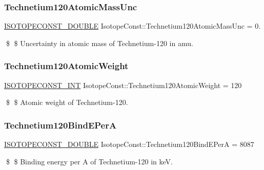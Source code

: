 \subsubsection{\texorpdfstring{Technetium120\+Atomic\+Mass\+Unc}{Technetium120AtomicMassUnc}}
{\footnotesize\ttfamily \mbox{\hyperlink{group___isotope_const-_macros_ga8f45a7272ce02c0b4c65c44636ed719a}{I\+S\+O\+T\+O\+P\+E\+C\+O\+N\+S\+T\+\_\+\+D\+O\+U\+B\+LE}} Isotope\+Const\+::\+Technetium120\+Atomic\+Mass\+Unc = 0.}

\$ \$ Uncertainty in atomic mass of Technetium-\/120 in amu. \mbox{\label{group___isotope_const-_technetium-_tc120_ga1ae5a6d9d6c0bbf7ccd915e143a5fdf1}} 
\subsubsection{\texorpdfstring{Technetium120\+Atomic\+Weight}{Technetium120AtomicWeight}}
{\footnotesize\ttfamily \mbox{\hyperlink{group___isotope_const-_macros_ga5f18360b3e99483a35c32d789e62621c}{I\+S\+O\+T\+O\+P\+E\+C\+O\+N\+S\+T\+\_\+\+I\+NT}} Isotope\+Const\+::\+Technetium120\+Atomic\+Weight = 120}

\$ \$ Atomic weight of Technetium-\/120. \mbox{\label{group___isotope_const-_technetium-_tc120_ga71acc4337bf8fbf9585c86a74a6483f0}} 
\subsubsection{\texorpdfstring{Technetium120\+Bind\+E\+PerA}{Technetium120BindEPerA}}
{\footnotesize\ttfamily \mbox{\hyperlink{group___isotope_const-_macros_ga8f45a7272ce02c0b4c65c44636ed719a}{I\+S\+O\+T\+O\+P\+E\+C\+O\+N\+S\+T\+\_\+\+D\+O\+U\+B\+LE}} Isotope\+Const\+::\+Technetium120\+Bind\+E\+PerA = 8087}

\$ \$ Binding energy per A of Technetium-\/120 in keV. \mbox{\label{group___isotope_const-_technetium-_tc120_gaed991d09306cad526c3f78475321e6fb}} 
